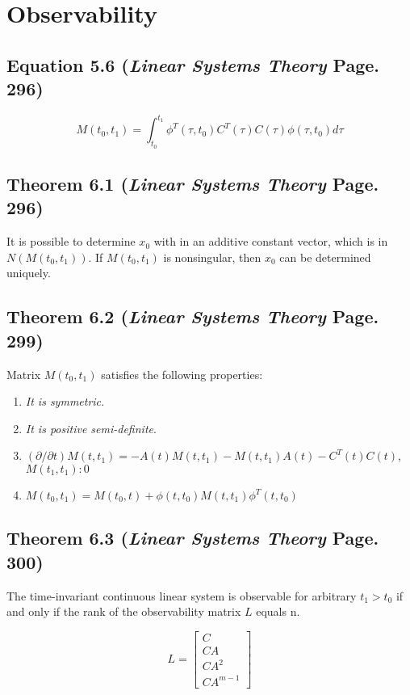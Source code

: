 \documentclass[12pt]{article}
\begin{document}
\newpage
\section*{Observability}

\subsection*{Equation 5.6 ({\em Linear Systems Theory} Page. 296)}
$$M(t_0,t_1)=\int_{t_0}^{t_1}\phi^T(\tau,t_0)C^T(\tau)C(\tau)\phi(\tau,t_0)d\tau$$

\subsection*{Theorem 6.1 ({\em Linear Systems Theory} Page. 296)}
It is possible to determine $x_0$ with in an additive constant vector, which is in $N(M(t_0,t_1))$. If $M(t_0,t_1)$ is nonsingular, then $x_0$ can be determined uniquely.

\subsection*{Theorem 6.2 ({\em Linear Systems Theory} Page. 299)}
Matrix $M(t_0,t_1)$ satisfies the following properties:
\renewcommand{\labelenumiii}{\Roman{enumii}}
\begin{enumerate}
  \item {\em It is symmetric.}
  \item {\em It is positive semi-definite}. 
  \item $(\partial/\partial t)M(t,t_1)=-A(t)M(t,t_1)-M(t,t_1)A(t)-C^T(t)C(t)$, \\$M(t_1,t_1):0$
  \item $M(t_0,t_1)=M(t_0,t)+\phi(t,t_0)M(t,t_1)\phi^T(t,t_0)$
\end{enumerate}

\subsection*{Theorem 6.3 ({\em Linear Systems Theory} Page. 300)}
The time-invariant continuous linear system is observable for arbitrary $t_1>t_0$ if and only if the rank of the observability matrix $L$ equals n.

$$L=\begin{bmatrix}
C \\
CA \\
CA^2 \\
CA^{m-1}
\end{bmatrix}
$$
\end{document}
